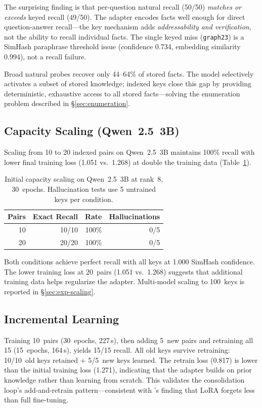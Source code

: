 \documentclass[11pt]{article}
\begin{document}
The surprising finding is that per-question natural recall (50/50) \emph{matches or exceeds} keyed recall (49/50).
The adapter encodes facts well enough for direct question-answer recall---the key mechanism adds \emph{addressability and verification}, not the ability to recall individual facts.
The single keyed miss (\texttt{graph23}) is a SimHash paraphrase threshold issue (confidence 0.734, embedding similarity 0.994), not a recall failure.

Broad natural probes recover only 44--64\% of stored facts.
The model selectively activates a subset of stored knowledge; indexed keys close this gap by providing deterministic, exhaustive access to all stored facts---solving the enumeration problem described in \S\ref{sec:enumeration}.

\subsection{Capacity Scaling (Qwen~2.5~3B)}
\label{sec:exp-capacity}

Scaling from 10 to 20 indexed pairs on Qwen~2.5~3B maintains 100\% recall with lower final training loss (1.051 vs.\ 1.268) at double the training data (Table~\ref{tab:capacity}).

\begin{table}[t]
\centering
\caption{Initial capacity scaling on Qwen~2.5~3B at rank~8, 30~epochs. Hallucination tests use 5 untrained keys per condition.}
\label{tab:capacity}
\small
\begin{tabular}{@{}rrrr@{}}
\toprule
\textbf{Pairs} & \textbf{Exact Recall} & \textbf{Rate} & \textbf{Hallucinations} \\
\midrule
10 & 10/10 & 100\% & 0/5 \\
20 & 20/20 & 100\% & 0/5 \\
\bottomrule
\end{tabular}
\end{table}
Both conditions achieve perfect recall with all keys at 1.000 SimHash confidence.
The lower training loss at 20~pairs (1.051 vs.\ 1.268) suggests that additional training data helps regularize the adapter.
Multi-model scaling to 100~keys is reported in \S\ref{sec:exp-scaling}.

\subsection{Incremental Learning}
\label{sec:exp-incremental}

Training 10~pairs (30~epochs, 227\,s), then adding 5~new pairs and retraining all 15 (15~epochs, 164\,s), yields 15/15 recall.
All old keys survive retraining: 10/10~old keys retained + 5/5~new keys learned.
The retrain loss (0.817) is lower than the initial training loss (1.271), indicating that the adapter builds on prior knowledge rather than learning from scratch.
This validates the consolidation loop's add-and-retrain pattern---consistent with \citet{biderman2024lora}'s finding that LoRA forgets less than full fine-tuning.
\end{document}
